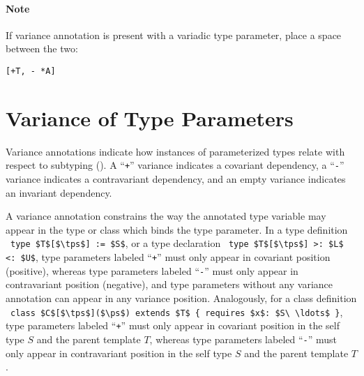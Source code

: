 \paragraph{Note}
If variance annotation is present with a variadic type parameter, place a space between the two:
\begin{lstlisting}
[+T, - *A]
\end{lstlisting}






\section{Variance of Type Parameters}
\label{sec:variance-of-type-parameters}

Variance annotations indicate how instances of parameterized types relate with respect to subtyping (). A ``\lstinline!+!'' variance indicates a covariant dependency, a ``\lstinline!-!'' variance indicates a contravariant dependency, and an empty variance indicates an invariant dependency. 

A variance annotation constrains the way the annotated type variable may appear in the type or class which binds the type parameter. In a type definition ~\lstinline!type $T$[$\tps$] := $S$!, or a type declaration ~\lstinline!type $T$[$\tps$] >: $L$ <: $U$!, type parameters labeled ``\lstinline!+!'' must only appear in covariant position (positive), whereas type parameters labeled ``\lstinline!-!'' must only appear in contravariant position (negative), and type parameters without any variance annotation can appear in any variance position. Analogously, for a class definition ~\lstinline!class $C$[$\tps$]($\ps$) extends $T$ { requires $x$: $S\ \ldots$ }!, type parameters labeled ``\lstinline!+!'' must only appear in covariant position in the self type $S$ and the parent template $T$, whereas type parameters labeled ``\lstinline!-!'' must only appear in contravariant position in the self type $S$ and the parent template $T$.

